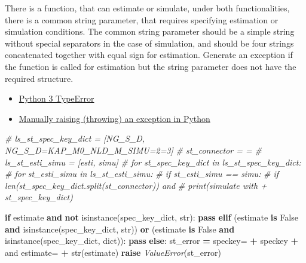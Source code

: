 \documentclass[
]{book}
\newenvironment{Shaded}{\begin{snugshade}}{\end{snugshade}}
\newcommand{\BuiltInTok}[1]{#1}
\newcommand{\CommentTok}[1]{\textcolor[rgb]{0.56,0.35,0.01}{\textit{#1}}}
\newcommand{\ControlFlowTok}[1]{\textcolor[rgb]{0.13,0.29,0.53}{\textbf{#1}}}
\newcommand{\KeywordTok}[1]{\textcolor[rgb]{0.13,0.29,0.53}{\textbf{#1}}}
\newcommand{\NormalTok}[1]{#1}
\newcommand{\OperatorTok}[1]{\textcolor[rgb]{0.81,0.36,0.00}{\textbf{#1}}}
\newcommand{\PreprocessorTok}[1]{\textcolor[rgb]{0.56,0.35,0.01}{\textit{#1}}}
\newcommand{\StringTok}[1]{\textcolor[rgb]{0.31,0.60,0.02}{#1}}
\newcommand{\VariableTok}[1]{\textcolor[rgb]{0.00,0.00,0.00}{#1}}
\providecommand{\tightlist}{%
  \setlength{\itemsep}{0pt}\setlength{\parskip}{0pt}}
\begin{document}
There is a function, that can estimate or simulate, under both functionalities, there is a common string parameter, that requires specifying estimation or simulation conditions. The common string parameter should be a simple string without special separators in the case of simulation, and should be four strings concatenated together with equal sign for estimation. Generate an exception if the function is called for estimation but the string parameter does not have the required structure.

\begin{itemize}
\tightlist
\item
  \href{https://docs.python.org/3/library/exceptions.html\#TypeError}{Python 3 TypeError}
\item
  \href{https://stackoverflow.com/a/30317038/8280804}{Manually raising (throwing) an exception in Python}
\end{itemize}

\begin{Shaded}
\begin{Highlighting}[]
\CommentTok{\# ls\_st\_spec\_key\_dict = [\textquotesingle{}NG\_S\_D\textquotesingle{}, \textquotesingle{}NG\_S\_D=KAP\_M0\_NLD\_M\_SIMU=2=3\textquotesingle{}]}
\CommentTok{\# st\_connector = \textquotesingle{}=\textquotesingle{}}
\CommentTok{\# ls\_st\_esti\_simu = [\textquotesingle{}esti\textquotesingle{}, \textquotesingle{}simu\textquotesingle{}]}
\CommentTok{\# for st\_spec\_key\_dict in ls\_st\_spec\_key\_dict:}
\CommentTok{\#   for st\_esti\_simu in ls\_st\_esti\_simu:}
\CommentTok{\#     if st\_esti\_simu == \textquotesingle{}simu\textquotesingle{}:}
\CommentTok{\#       if len(st\_spec\_key\_dict.split(st\_connector)) and}
\CommentTok{\#         print(\textquotesingle{}simulate with \textquotesingle{} + st\_spec\_key\_dict)}

\ControlFlowTok{if}\NormalTok{ estimate }\KeywordTok{and} \KeywordTok{not} \BuiltInTok{isinstance}\NormalTok{(spec\_key\_dict, }\BuiltInTok{str}\NormalTok{):}
    \ControlFlowTok{pass}
\ControlFlowTok{elif}\NormalTok{ (estimate }\KeywordTok{is} \VariableTok{False} \KeywordTok{and} \BuiltInTok{isinstance}\NormalTok{(spec\_key\_dict, }\BuiltInTok{str}\NormalTok{)) }\KeywordTok{or}\NormalTok{ (estimate }\KeywordTok{is} \VariableTok{False} \KeywordTok{and} \BuiltInTok{isinstance}\NormalTok{(spec\_key\_dict, }\BuiltInTok{dict}\NormalTok{)):}
    \ControlFlowTok{pass}
\ControlFlowTok{else}\NormalTok{:}
\NormalTok{    st\_error }\OperatorTok{=} \StringTok{\textquotesingle{}speckey=\textquotesingle{}} \OperatorTok{+}\NormalTok{ speckey }\OperatorTok{+} \StringTok{\textquotesingle{} and estimate=\textquotesingle{}} \OperatorTok{+} \BuiltInTok{str}\NormalTok{(estimate)}
    \ControlFlowTok{raise} \PreprocessorTok{ValueError}\NormalTok{(st\_error)}
\end{Highlighting}
\end{Shaded}
\end{document}
